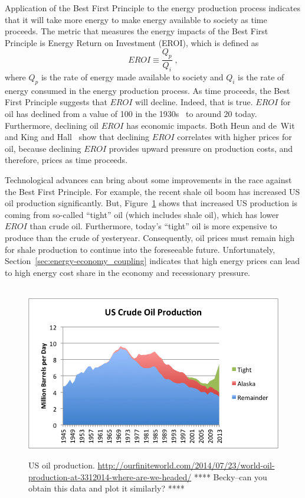 Application of the Best First Principle to the energy production process 
indicates that it will take more energy 
to make energy available to society as time proceeds.
The metric that measures the energy impacts of the Best First Principle is 
Energy Return on Investment (EROI), which is defined as 
%
\begin{equation}
	EROI \equiv \frac{Q_p}{Q_i} \; ,
\end{equation}
%
where $Q_p$ is the rate of energy made available to society
and $Q_i$ is the rate of energy consumed in the energy production process.
As time proceeds, the Best First Principle suggests that
$EROI$ will decline.
Indeed, that is true.
$EROI$ for oil has declined 
from a value of 100 in the 1930s~\cite[p.~781]{Cleveland:2005uy} 
to around 20 today.\cite[Fig.~2]{Hall:2014aa}
Furthermore, declining oil $EROI$ has economic impacts.
Both Heun and de~Wit~\cite{Heun:2012ek} and King and Hall~\cite{King:2011go}
show that declining $EROI$ correlates with higher prices for oil, 
because declining $EROI$ provides upward pressure on 
production costs, and therefore, prices
as time proceeds.

Technological advances can bring about some improvements 
in the race against the Best First Principle.
For example, the recent shale oil boom has increased US oil production
significantly. 
But, Figure~\ref{fig:US_oil_production} shows that increased US production
is coming from so-called ``tight'' oil (which includes shale oil), 
which has lower $EROI$ than crude oil.
Furthermore, today's ``tight'' oil is more expensive to produce 
than the crude of yesteryear.
Consequently, oil prices must remain high for 
shale production to continue into the foreseeable future. 
Unfortunately, Section~\ref{sec:energy-economy_coupling} indicates that
high energy prices can lead to high energy cost share in the economy
and recessionary pressure.

\begin{figure}[!ht]
\centering\
\includegraphics[width=\linewidth]{Part_0/Chapter_Introduction/images/us-crude-oil-production-including-tight-oil.png}
\caption[US oil production]{US oil production.
\url{http://ourfiniteworld.com/2014/07/23/world-oil-production-at-3312014-where-are-we-headed/}
**** Becky--can you obtain this data and plot it similarly? ****
}
\label{fig:US_oil_production}
\end{figure}

